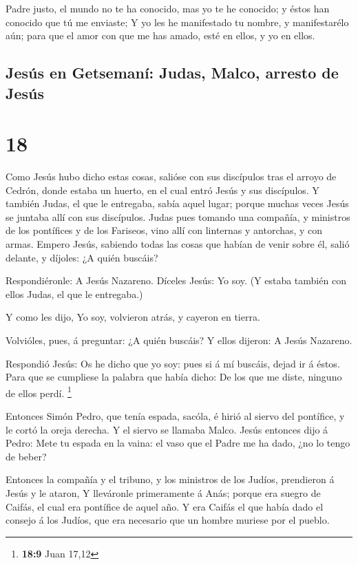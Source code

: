  Padre justo, el mundo no te ha conocido, mas yo te he
conocido; y éstos han conocido que tú me enviaste;  Y yo
les he manifestado tu nombre, y manifestarélo aún; para que el amor con
que me has amado, esté en ellos, y yo en ellos.

\hypertarget{jesuxfas-en-getsemanuxed-judas-malco-arresto-de-jesuxfas}{%
\subsection{Jesús en Getsemaní: Judas, Malco, arresto de
Jesús}\label{jesuxfas-en-getsemanuxed-judas-malco-arresto-de-jesuxfas}}

\hypertarget{section-17}{%
\section{18}\label{section-17}}

 Como Jesús hubo dicho estas cosas, salióse con sus
discípulos tras el arroyo de Cedrón, donde estaba un huerto, en el cual
entró Jesús y sus discípulos.  Y también Judas, el que le
entregaba, sabía aquel lugar; porque muchas veces Jesús se juntaba allí
con sus discípulos.  Judas pues tomando una compañía, y
ministros de los pontífices y de los Fariseos, vino allí con linternas y
antorchas, y con armas.  Empero Jesús, sabiendo todas las
cosas que habían de venir sobre él, salió delante, y díjoles: ¿A quién
buscáis?

 Respondiéronle: A Jesús Nazareno. Díceles Jesús: Yo soy. (Y
estaba también con ellos Judas, el que le entregaba.)

 Y como les dijo, Yo soy, volvieron atrás, y cayeron en
tierra.

 Volvióles, pues, á preguntar: ¿A quién buscáis? Y ellos
dijeron: A Jesús Nazareno.

 Respondió Jesús: Os he dicho que yo soy: pues si á mí
buscáis, dejad ir á éstos.  Para que se cumpliese la palabra
que había dicho: De los que me diste, ninguno de ellos perdí.
\footnote{\textbf{18:9} Juan 17,12}

 Entonces Simón Pedro, que tenía espada, sacóla, é hirió al
siervo del pontífice, y le cortó la oreja derecha. Y el siervo se
llamaba Malco.  Jesús entonces dijo á Pedro: Mete tu espada
en la vaina: el vaso que el Padre me ha dado, ¿no lo tengo de beber?

 Entonces la compañía y el tribuno, y los ministros de los
Judíos, prendieron á Jesús y le ataron,  Y lleváronle
primeramente á Anás; porque era suegro de Caifás, el cual era pontífice
de aquel año.  Y era Caifás el que había dado el consejo á
los Judíos, que era necesario que un hombre muriese por el pueblo.

